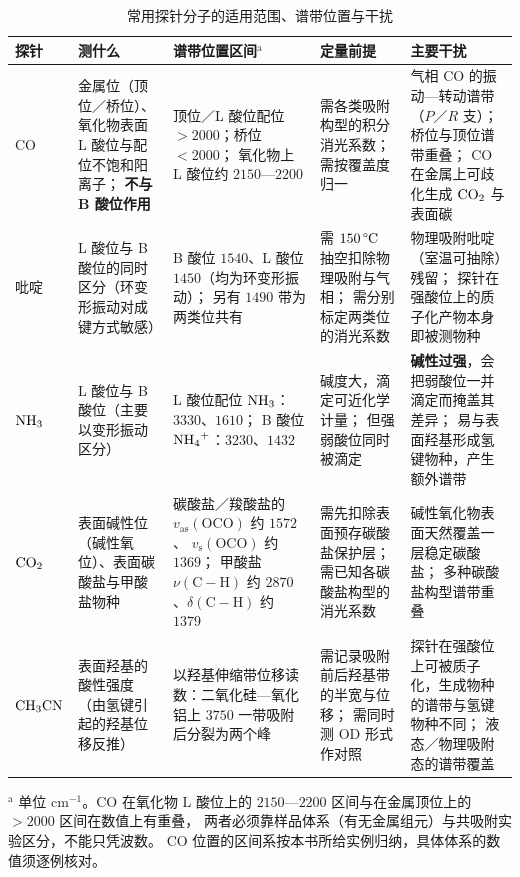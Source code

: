 \begin{table}[htbp]
\centering
\caption{常用探针分子的适用范围、谱带位置与干扰}
\label{tab:ch07b-probes}
\small
\begin{tabularx}{\onecolwidth}{@{}>{\raggedright\arraybackslash}p{13mm}
 >{\raggedright\arraybackslash}p{30mm}
 >{\raggedright\arraybackslash}p{29mm}
 >{\raggedright\arraybackslash}X
 >{\raggedright\arraybackslash}X@{}}
\toprule
探针 & 测什么 & 谱带位置区间$^{\mathrm{a}}$ & 定量前提 & 主要干扰 \\
\midrule
CO &
 金属位（顶位／桥位）、氧化物表面 L 酸位与配位不饱和阳离子；
 \textbf{不与 B 酸位作用} &
 顶位／L 酸位配位 $>2000$；桥位 $<2000$；
 氧化物上 L 酸位约 $2150$—$2200$ &
 需各类吸附构型的积分消光系数；
 需按覆盖度归一 &
 气相 CO 的振动—转动谱带（$P$／$R$ 支）；
 桥位与顶位谱带重叠；
 CO 在金属上可歧化生成 $\ce{CO2}$ 与表面碳 \\
吡啶 &
 L 酸位与 B 酸位的同时区分（环变形振动对成键方式敏感） &
 B 酸位 $1540$、L 酸位 $1450$（均为环变形振动）；
 另有 $1490$ 带为两类位共有 &
 需 $150\,\degC$ 抽空扣除物理吸附与气相；
 需分别标定两类位的消光系数 &
 物理吸附吡啶（室温可抽除）残留；
 探针在强酸位上的质子化产物本身即被测物种 \\
$\ce{NH3}$ &
 L 酸位与 B 酸位（主要以变形振动区分） &
 L 酸位配位 $\ce{NH3}$：$3330$、$1610$；
 B 酸位 $\ce{NH4+}$：$3230$、$1432$ &
 碱度大，滴定可近化学计量；
 但强弱酸位同时被滴定 &
 \textbf{碱性过强}，会把弱酸位一并滴定而掩盖其差异；
 易与表面羟基形成氢键物种，产生额外谱带 \\
$\ce{CO2}$ &
 表面碱性位（碱性氧位）、表面碳酸盐与甲酸盐物种 &
 碳酸盐／羧酸盐的 $v_{\mathrm{as}}(\mathrm{OCO})$ 约 $1572$、
 $v_{\mathrm{s}}(\mathrm{OCO})$ 约 $1369$；
 甲酸盐 $\nu(\mathrm{C{-}H})$ 约 $2870$、$\delta(\mathrm{C{-}H})$ 约 $1379$ &
 需先扣除表面预存碳酸盐保护层；
 需已知各碳酸盐构型的消光系数 &
 碱性氧化物表面天然覆盖一层稳定碳酸盐；
 多种碳酸盐构型谱带重叠 \\
$\ce{CH3CN}$ &
 表面羟基的酸性强度（由氢键引起的羟基位移反推） &
 以羟基伸缩带位移读数：二氧化硅—氧化铝上
 $3750$ 一带吸附后分裂为两个峰 &
 需记录吸附前后羟基带的半宽与位移；
 需同时测 OD 形式作对照 &
 探针在强酸位上可被质子化，生成物种的谱带与氢键物种不同；
 液态／物理吸附态的谱带覆盖 \\
\bottomrule
\end{tabularx}

\vspace{1pt}
{\srcsize $^{\mathrm{a}}$ 单位 $\mathrm{cm^{-1}}$。CO 在氧化物 L 酸位上的
$2150$—$2200$ 区间与在金属顶位上的 $>2000$ 区间在数值上有重叠，
两者必须靠样品体系（有无金属组元）与共吸附实验区分，不能只凭波数。
CO 位置的区间系按本书所给实例归纳，具体体系的数值须逐例核对。}
\end{table}

